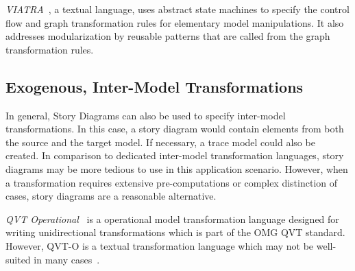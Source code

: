 \emph{VIATRA}~\cite{viatra}, a textual language, uses abstract state machines to specify the control flow and graph transformation rules for elementary model manipulations.
It also addresses modularization by reusable patterns that are called from the graph transformation rules. 



\subsection{Exogenous, Inter-Model Transformations}

In general, Story Diagrams can also be used to specify inter-model transformations.
In this case, a story diagram would contain elements from both the source and the target model.
If necessary, a trace model could also be created.
In comparison to dedicated inter-model transformation languages, story diagrams may be more tedious to use in this application scenario.
However, when a transformation requires extensive pre-computations or complex distinction of cases, story diagrams are a reasonable alternative.

\emph{QVT Operational}~\cite{QVT} is a operational model transformation language designed for writing unidirectional transformations which is part of the OMG QVT standard. %
However, QVT-O is a textual transformation language which may not be well-suited in many cases~\cite{Moo09}.


